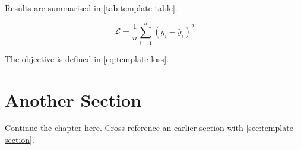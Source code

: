 Results are summarised in \cref{tab:template-table}.

\begin{equation}
  \label{eq:template-loss}
  \mathcal{L} = \frac{1}{n} \sum_{i=1}^{n} (y_i - \hat{y}_i)^2
\end{equation}

The objective is defined in \cref{eq:template-loss}.

\section{Another Section}
\label{sec:template-section-two}

Continue the chapter here. Cross-reference an earlier section with
\cref{sec:template-section}.
